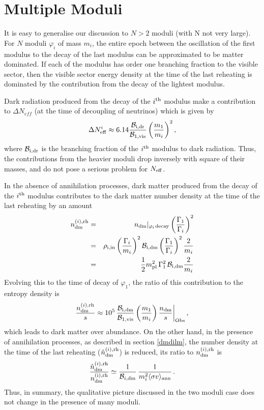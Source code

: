 \documentclass[12pt]{article}
\numberwithin{equation}{section}
\def\bea{\begin{eqnarray}}
\def\eea{\end{eqnarray}}
\begin{document}
\appendix


\section{Multiple Moduli}
\label{Nmoduli}
It is easy to generalise our discussion to $N>2$ moduli (with N not very large). For $N$ moduli $\varphi_i$ of mass $m_i$, the entire epoch
between the oscillation of the first modulus to the decay of the last modulus can be approximated to be matter dominated. If each of the
modulus has order one branching fraction to the visible sector, then the visible sector energy density at the time of the last reheating is dominated
by the contribution from the decay of the lightest modulus. 

Dark radiation produced from the decay of the $i^{\rm th}$ modulus make a contribution to $\Delta N_{eff}$ (at the time of decoupling
of neutrinos) which is given by
%
$$
   \Delta N^{i}_{\rm eff}  \approx  6.14 {  {\cal B}_{\rm i,dr}  \over {\cal B}_{\rm 1,vis} } \left( { m_1 \over m_i} \right)^2,
$$
%
where ${\cal B}_{\rm i,dr}$ is the branching fraction of the $i^{\rm th}$ modulus to dark radiation. Thus, the contributions
from the heavier moduli drop inversely with square of their masses, and do not pose a serious problem for $N_{\rm eff}$.

In the absence of annihilation processes, dark matter produced from the decay of the $i^{\rm th}$ modulus contributes to
the dark matter number density at the time of the last reheating by an amount
%
%
\bea
n_{\rm dm}^ {(i), \rm rh} &=&  n_{\rm dm}|_ {\rm \varphi_i \, decay}  \left( \frac{\Gamma_1}{\Gamma_i} \right)^2 \cr
&=& \rho_{\rm i, in} \left( \frac{\Gamma_i}{m_i} \right)^2  {\cal B}_{\rm i,dm}  \left( \frac{\Gamma_1}{\Gamma_i} \right)^2 \frac{2}{m_i} \cr
&=&  \frac{1}{2} m_{\rm pl}^2 \, \Gamma_1^2  \, {\cal B}_{\rm i,dm} \frac{2}{m_i}  \label{nDMirh}
\eea
%
Evolving this to the time of decay of $\varphi_{1}$, the ratio of this contribution to the entropy density
is 
%
\begin{equation}
\label{nsii}
 { n^{(i), \rm{rh}}_{\rm dm} \over s } \approx  10^{5}  \, \frac{{\cal B}_{\rm i, dm }}{{\cal B}_{\rm 1, vis } }  \left( {m_1 \over
 m_i} \right)    {n_{\rm dm} \over s }\bigg{|}_{\rm Obs}  \, ,
 \end{equation}
%
which leads to dark matter over abundance. On the other hand, in the presence of annihilation processes, as described in section
\ref{dmdilm}, the number density at the time of the last reheating (${\hat n}_{\rm dm}^{(i), \rm rh}$) is reduced,  its ratio to ${ n^{(i), \rm{rh}}_{\rm dm} }$ is
%
\begin{equation}
\label{eq:RatioAbundancesappi}
\frac{{\hat n}_{\rm dm}^{(i), \rm rh}}{n_{\rm dm}^{\rm(i), rh} } 
 \simeq
\frac{1}{\mathcal{B}_{i, \rm dm}} \, \frac{1}{m_i^2 \langle \sigma v \rangle_{\rm ann}}  \, .
\end{equation}
%
Thus, in summary, the qualitative picture discussed in the two moduli case does not change in the presence of many moduli.
\end{document}
